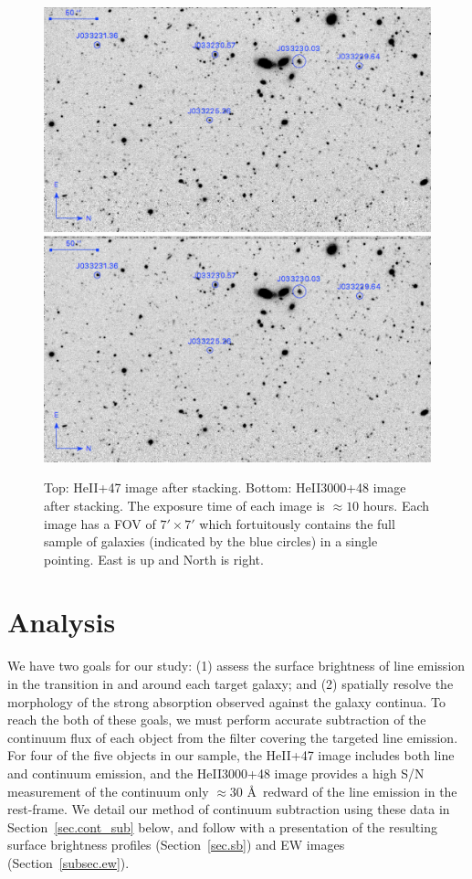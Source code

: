 \documentclass[twocolumn]{aastex61}
\begin{document}
\begin{figure}[ht!]
\centering
\includegraphics[scale=.61]{../Figures/HEII_final.png}
\includegraphics[scale=.61]{../Figures/HEII3000_final.png}
\caption{Top: HeII+47 image after stacking. Bottom: HeII3000+48 image after stacking. The exposure time of each image is $\approx 10$ hours. Each image has a FOV of $7' \times 7'$ which fortuitously contains the full sample of galaxies (indicated by the blue circles) in a single pointing. East is up and North is right.
\label{fig:stacked_image}}
\end{figure}

\section{Analysis}
We have two goals for our study: (1) assess the surface brightness of line emission in the  transition in and around each target galaxy; and (2) spatially resolve the morphology of the strong  absorption observed against the galaxy continua.  To reach the both of these goals, we must perform accurate subtraction of the continuum flux of each object from the filter covering the targeted line emission. For four of the five objects in our sample, the HeII+47 image includes both line and continuum emission, and the HeII3000+48 image provides a high S/N measurement of the continuum only $\approx30$ \AA\ redward of the line emission in the rest-frame.  We detail our method of continuum subtraction using these data in Section~\ref{sec.cont_sub} below, and follow with a presentation of the resulting surface brightness profiles (Section~\ref{sec.sb}) and EW images (Section~\ref{subsec.ew}).
\end{document}
